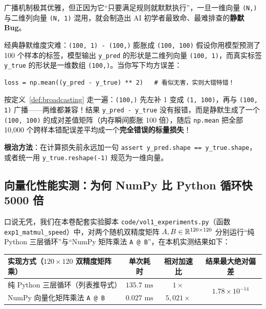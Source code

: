 广播机制极其优雅，但正因为它“只要满足规则就默默执行”，一旦一维向量 \texttt{(N,)} 与二维列向量 \texttt{(N, 1)} 混用，就会制造出 AI 初学者最致命、最难排查的\textbf{静默 Bug}。

\begin{failBox}{经典静默维度灾难：\texttt{(100, 1) - (100,)} 膨胀成 \texttt{(100, 100)}}
假设你用模型预测了 100 个样本的标签，模型输出 \texttt{y\_pred} 的形状是二维列向量 \texttt{(100, 1)}，而真实标签 \texttt{y\_true} 的形状是一维数组 \texttt{(100,)}。当你写下均方误差：
\begin{lstlisting}[numbers=none]
loss = np.mean((y_pred - y_true) ** 2)   # 看似无害，实则大错特错！
\end{lstlisting}
按定义~\ref{def:broadcasting} 走一遍：\texttt{(100,)} 先左补 1 变成 \texttt{(1, 100)}，再与 \texttt{(100, 1)} 广播——两维都兼容！结果 \texttt{y\_pred - y\_true} 没有报错，而是静默生成了一个 \texttt{(100, 100)} 的成对差值矩阵（内存瞬间膨胀 100 倍），随后 \texttt{np.mean} 把全部 10,000 个跨样本错配误差平均成一个\textbf{完全错误的标量损失}！

\textbf{根治方法}：在计算损失前永远加一句 \texttt{assert y\_pred.shape == y\_true.shape}，或者统一用 \texttt{y\_true.reshape(-1)} 规范为一维向量。
\end{failBox}

\subsection{向量化性能实测：为何 NumPy 比 Python 循环快 5000 倍}

口说无凭，我们在本卷配套实验脚本 \texttt{code/vol1\_experiments.py}（函数 \texttt{exp1\_matmul\_speed}）中，对两个随机双精度矩阵 $A, B \in \mathbb{R}^{120 \times 120}$ 分别运行“纯 Python 三层循环”与“NumPy 矩阵乘法 \texttt{A @ B}”，在本机实测结果如下：

\begin{center}
{\small
\begin{tabular}{@{}lccc@{}}
\toprule
\textbf{实现方式（$120 \times 120$ 双精度矩阵乘）} & \textbf{单次耗时} & \textbf{相对加速比} & \textbf{结果最大绝对偏差} \\
\midrule
纯 Python 三层循环（列表推导式） & $135.7\text{ ms}$ & $1\times$ & \multirow{2}{*}{$1.78 \times 10^{-14}$} \\
NumPy 向量化矩阵乘法 \texttt{A @ B} & $0.027\text{ ms}$ & \textbf{$5{,}021\times$} & \\
\bottomrule
\end{tabular}}
\end{center}

